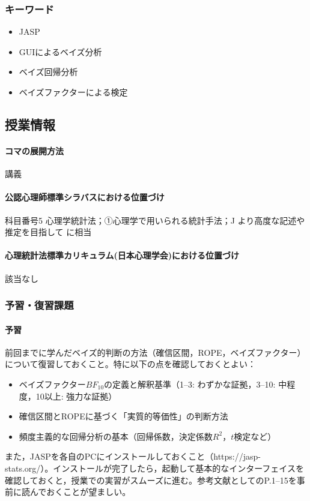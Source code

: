 \subsubsection{キーワード}
\begin{itemize}
	\item JASP
	\item GUIによるベイズ分析
	\item ベイズ回帰分析
	\item ベイズファクターによる検定
\end{itemize}
\subsection{授業情報}
\paragraph{コマの展開方法}
講義
\paragraph{公認心理師標準シラバスにおける位置づけ}
科目番号5 心理学統計法；①心理学で用いられる統計手法；J より高度な記述や推定を目指して に相当
\paragraph{心理統計法標準カリキュラム(日本心理学会)における位置づけ}
該当なし
\subsubsection{予習・復習課題}
\paragraph{予習}
前回までに学んだベイズ的判断の方法（確信区間，ROPE，ベイズファクター）について復習しておくこと。特に以下の点を確認しておくとよい：
\begin{itemize}
  \item ベイズファクター$BF_{10}$の定義と解釈基準（1--3: わずかな証拠，3--10: 中程度，10以上: 強力な証拠）
  \item 確信区間とROPEに基づく「実質的等価性」の判断方法
  \item 頻度主義的な回帰分析の基本（回帰係数，決定係数$R^2$，$t$検定など）
\end{itemize}
また，JASPを各自のPCにインストールしておくこと（https://jasp-stats.org/）。インストールが完了したら，起動して基本的なインターフェイスを確認しておくと，授業での実習がスムーズに進む。参考文献として\textcite{YUnaShimizu2022}のP.1--15を事前に読んでおくことが望ましい。

